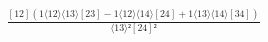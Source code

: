 \documentclass[varwidth, border=5pt]{standalone}
\begin{document}
\begin{my}
$\begin{gathered}
\scriptscriptstyle\frac{[12](1⟨12⟩⟨13⟩[23]-1⟨12⟩⟨14⟩[24]+1⟨13⟩⟨14⟩[34])}{⟨13⟩²[24]²}
\end{gathered}$
\end{my}
\end{document}
